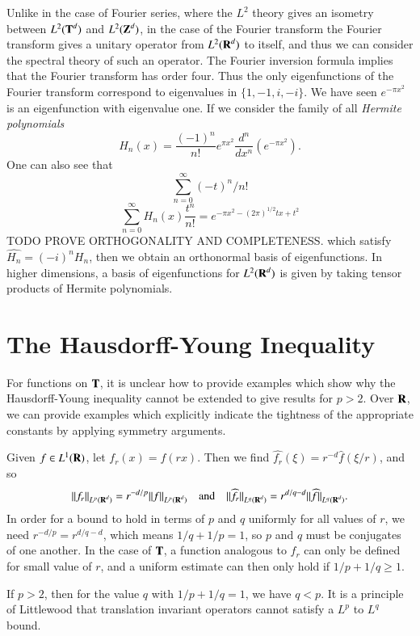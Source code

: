 Unlike in the case of Fourier series, where the $L^2$ theory gives an isometry between $L^2(\operatorname{\mathbf{T}}^d)$ and $L^2(\operatorname{\mathbf{Z}}^d)$, in the case of the Fourier transform the Fourier transform gives a unitary operator from $L^2(\operatorname{\mathbf{R}}^d)$ to itself, and thus we can consider the spectral theory of such an operator. The Fourier inversion formula implies that the Fourier transform has order four. Thus the only eigenfunctions of the Fourier transform correspond to eigenvalues in $\{ 1, -1, i, -i \}$. We have seen $e^{- \pi x^2}$ is an eigenfunction with eigenvalue one. If we consider the family of all \emph{Hermite polynomials}
%
\[ H_n(x) = \frac{(-1)^n}{n!} e^{\pi x^2} \frac{d^n}{dx^n} \left( e^{- \pi x^2} \right). \]
%
One can also see that
%
\[ \sum_{n = 0}^\infty (-t)^n/n! \]
\[ \sum_{n = 0}^\infty H_n(x) \frac{t^n}{n!} = e^{- \pi x^2 - (2\pi)^{1/2} tx + t^2} \]
%
TODO PROVE ORTHOGONALITY AND COMPLETENESS. which satisfy $\widehat{H_n} = (-i)^n H_n$, then we obtain an orthonormal basis of eigenfunctions. In higher dimensions, a basis of eigenfunctions for $L^2(\operatorname{\mathbf{R}}^d)$ is given by taking tensor products of Hermite polynomials.


\section{The Hausdorff-Young Inequality}

For functions on $\operatorname{\mathbf{T}}$, it is unclear how to provide examples which show why the Hausdorff-Young inequality cannot be extended to give results for $p > 2$. Over $\operatorname{\mathbf{R}}$, we can provide examples which explicitly indicate the tightness of the appropriate constants by applying symmetry arguments.

\begin{example}
    Given $f \in L^1(\operatorname{\mathbf{R}})$, let $f_r(x) = f(rx)$. Then we find $\widehat{f_r}(\xi) = r^{-d} \widehat{f}(\xi/r)$, and so
    \[ \| f_r \|_{L^p(\operatorname{\mathbf{R}}^d)} = r^{-d/p} \| f \|_{L^p(\operatorname{\mathbf{R}}^d)} \quad \text{and} \quad \| \widehat{f_r} \|_{L^q(\operatorname{\mathbf{R}}^d)} = r^{d/q-d} \| \widehat{f} \|_{L^q(\operatorname{\mathbf{R}}^d)}. \]
    In order for a bound to hold in terms of $p$ and $q$ uniformly for all values of $r$, we need $r^{-d/p} = r^{d/q-d}$, which means $1/q + 1/p = 1$, so $p$ and $q$ must be conjugates of one another. In the case of $\operatorname{\mathbf{T}}$, a function analogous to $f_r$ can only be defined for small value of $r$, and a uniform estimate can then only hold if $1/p + 1/q \geq 1$.
\end{example}

If $p > 2$, then for the value $q$ with $1/p + 1/q = 1$, we have $q < p$. It is a principle of Littlewood that translation invariant operators cannot satisfy a $L^p$ to $L^q$ bound.

